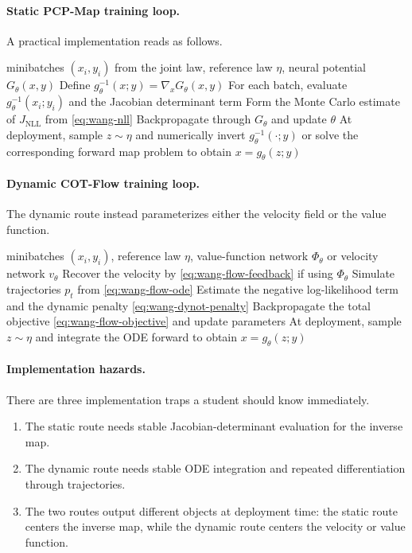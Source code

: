 \documentclass[11pt]{report}
\begin{document}
\paragraph{Static PCP-Map training loop.}
A practical implementation reads as follows.
\begin{algorithm}[ht]
\caption{Static PCP-Map training loop}
\begin{algorithmic}[1]
\Require minibatches $(x_i,y_i)$ from the joint law, reference law $\eta$, neural potential $G_\theta(x,y)$
\State Define $g_\theta^{-1}(x;y)=\nabla_x G_\theta(x,y)$
\State For each batch, evaluate $g_\theta^{-1}(x_i;y_i)$ and the Jacobian determinant term
\State Form the Monte Carlo estimate of $J_{\mathrm{NLL}}$ from \eqref{eq:wang-nll}
\State Backpropagate through $G_\theta$ and update $\theta$
\State At deployment, sample $z\sim\eta$ and numerically invert $g_\theta^{-1}(\cdot;y)$ or solve the corresponding forward map problem to obtain $x=g_\theta(z;y)$
\end{algorithmic}
\end{algorithm}

\paragraph{Dynamic COT-Flow training loop.}
The dynamic route instead parameterizes either the velocity field or the value
function.
\begin{algorithm}[ht]
\caption{Dynamic COT-Flow training loop}
\begin{algorithmic}[1]
\Require minibatches $(x_i,y_i)$, reference law $\eta$, value-function network $\Phi_\theta$ or velocity network $v_\theta$
\State Recover the velocity by \eqref{eq:wang-flow-feedback} if using $\Phi_\theta$
\State Simulate trajectories $p_t$ from \eqref{eq:wang-flow-ode}
\State Estimate the negative log-likelihood term and the dynamic penalty \eqref{eq:wang-dynot-penalty}
\State Backpropagate the total objective \eqref{eq:wang-flow-objective} and update parameters
\State At deployment, sample $z\sim\eta$ and integrate the ODE forward to obtain $x=g_\theta(z;y)$
\end{algorithmic}
\end{algorithm}

\paragraph{Implementation hazards.}
There are three implementation traps a student should know immediately.
\begin{enumerate}[label=(\roman*)]
  \item The static route needs stable Jacobian-determinant evaluation for the inverse map.
  \item The dynamic route needs stable ODE integration and repeated differentiation through trajectories.
  \item The two routes output different objects at deployment time: the static route centers the inverse map, while the dynamic route centers the velocity or value function.
\end{enumerate}
\end{document}

